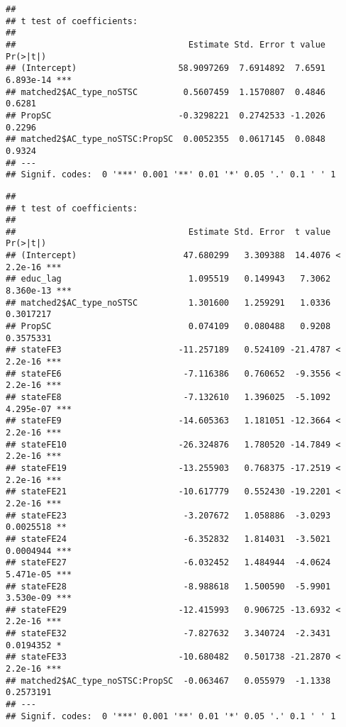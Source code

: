 \documentclass[
]{article}
\newenvironment{Shaded}{\begin{snugshade}}{\end{snugshade}}
\newcommand{\AttributeTok}[1]{\textcolor[rgb]{0.77,0.63,0.00}{#1}}
\newcommand{\FunctionTok}[1]{\textcolor[rgb]{0.00,0.00,0.00}{#1}}
\newcommand{\NormalTok}[1]{#1}
\newcommand{\OtherTok}[1]{\textcolor[rgb]{0.56,0.35,0.01}{#1}}
\newcommand{\SpecialCharTok}[1]{\textcolor[rgb]{0.00,0.00,0.00}{#1}}
\newcommand{\StringTok}[1]{\textcolor[rgb]{0.31,0.60,0.02}{#1}}
\begin{document}
\begin{verbatim}
## 
## t test of coefficients:
## 
##                                  Estimate Std. Error t value  Pr(>|t|)    
## (Intercept)                    58.9097269  7.6914892  7.6591 6.893e-14 ***
## matched2$AC_type_noSTSC         0.5607459  1.1570807  0.4846    0.6281    
## PropSC                         -0.3298221  0.2742533 -1.2026    0.2296    
## matched2$AC_type_noSTSC:PropSC  0.0052355  0.0617145  0.0848    0.9324    
## ---
## Signif. codes:  0 '***' 0.001 '**' 0.01 '*' 0.05 '.' 0.1 ' ' 1
\end{verbatim}

\begin{Shaded}
\end{Shaded}

\begin{verbatim}
## 
## t test of coefficients:
## 
##                                  Estimate Std. Error  t value  Pr(>|t|)    
## (Intercept)                     47.680299   3.309388  14.4076 < 2.2e-16 ***
## educ_lag                         1.095519   0.149943   7.3062 8.360e-13 ***
## matched2$AC_type_noSTSC          1.301600   1.259291   1.0336 0.3017217    
## PropSC                           0.074109   0.080488   0.9208 0.3575331    
## stateFE3                       -11.257189   0.524109 -21.4787 < 2.2e-16 ***
## stateFE6                        -7.116386   0.760652  -9.3556 < 2.2e-16 ***
## stateFE8                        -7.132610   1.396025  -5.1092 4.295e-07 ***
## stateFE9                       -14.605363   1.181051 -12.3664 < 2.2e-16 ***
## stateFE10                      -26.324876   1.780520 -14.7849 < 2.2e-16 ***
## stateFE19                      -13.255903   0.768375 -17.2519 < 2.2e-16 ***
## stateFE21                      -10.617779   0.552430 -19.2201 < 2.2e-16 ***
## stateFE23                       -3.207672   1.058886  -3.0293 0.0025518 ** 
## stateFE24                       -6.352832   1.814031  -3.5021 0.0004944 ***
## stateFE27                       -6.032452   1.484944  -4.0624 5.471e-05 ***
## stateFE28                       -8.988618   1.500590  -5.9901 3.530e-09 ***
## stateFE29                      -12.415993   0.906725 -13.6932 < 2.2e-16 ***
## stateFE32                       -7.827632   3.340724  -2.3431 0.0194352 *  
## stateFE33                      -10.680482   0.501738 -21.2870 < 2.2e-16 ***
## matched2$AC_type_noSTSC:PropSC  -0.063467   0.055979  -1.1338 0.2573191    
## ---
## Signif. codes:  0 '***' 0.001 '**' 0.01 '*' 0.05 '.' 0.1 ' ' 1
\end{verbatim}
\end{document}
